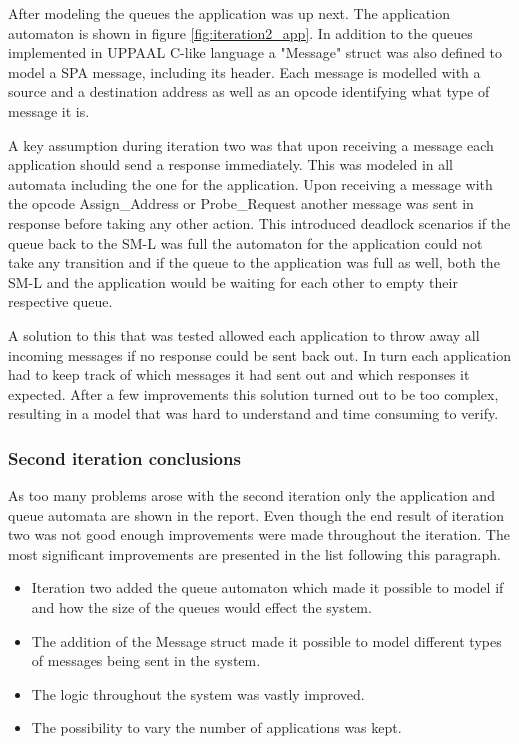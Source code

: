 After modeling the queues the application was up next. The application
automaton is shown in figure \ref{fig:iteration2_app}. In addition to the
queues implemented in UPPAAL C-like language a "Message" struct was also
defined to model a SPA message, including its header. Each message is modelled
with a source and a destination address as well as an opcode identifying what
type of message it is.

A key assumption during iteration two was that upon receiving a message each
application should send a response immediately. This was modeled in all
automata including the one for the application. Upon receiving a message with
the opcode Assign\_Address or Probe\_Request another message was sent in
response before taking any other action. This introduced deadlock scenarios if
the queue back to the SM-L was full the automaton for the application could not
take any transition and if the queue to the application was full as well, both
the SM-L and the application would be waiting for each other to empty their
respective queue.

A solution to this that was tested allowed each application to
throw away all incoming messages if no response could be sent back out. In turn
each application had to keep track of which messages it had sent out
and which responses it expected. After a few improvements this solution turned
out to be too complex, resulting in a model that was hard to understand and
time consuming to verify.

\subsubsection{Second iteration conclusions}
As too many problems arose with the second iteration only the application and
queue automata are shown in the report. Even though the end result of iteration
two was not good enough improvements were made throughout the iteration. The
most significant improvements are presented in the list following this
paragraph.

\begin{itemize}
    \item Iteration two added the queue automaton which made it possible to
        model if and how the size of the queues would effect the system.
    \item The addition of the Message struct made it possible to model
        different types of messages being sent in the system.
    \item The logic throughout the system was vastly improved.
    \item The possibility to vary the number of applications was kept.
\end{itemize}

